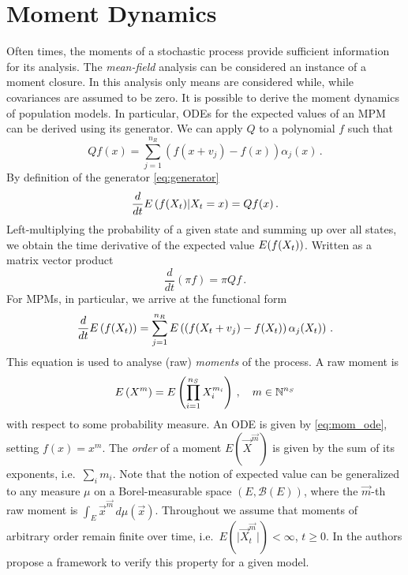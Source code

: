 \section{Moment Dynamics}\label{sec:moments_bg}
Often times, the moments of a stochastic process provide sufficient information for its analysis.
The \emph{mean-field} analysis \parencite{bortolussi2020fluid} can be considered an instance of a moment closure.
In this analysis only means are considered while, while covariances are assumed to be zero.
It is possible to derive the moment dynamics of population models.
In particular, \acp{ODE} for the expected values of an \ac{MPM} can be derived using its generator.
We can apply $Q$ to a polynomial $f$ such that
\begin{equation}\label{eq:Qf}
    Qf(x) = \sum_{j=1}^{n_R}\left(f(x+v_j) - f(x)\right)\alpha_j(x)\,.
\end{equation}
By definition of the generator \eqref{eq:generator}
\[
    \frac{d}{dt}{E}\left(f(X_t)|X_t=x\right) = Qf(x)\,.
\]
Left-multiplying the probability of a given state and summing up over all states, we
obtain the time derivative of the expected value ${E}(f(X_t))$.
Written as a matrix vector product
\[
    \frac{d}{dt}(\pi f) = \pi Qf\,.
\]
For \acp{MPM}, in particular, we arrive at the functional form
\begin{equation}\label{eq:mom_ode}
    \frac{d}{dt}{E}\left(f({X}_t)\right) = \sum_{j=1}^{n_R}{E}\left(\left(f({X_t +
    v_j}) - f(X_t)\right)\alpha_j(X_t)\right)\,.
\end{equation}
This equation is used to analyse (raw) \emph{moments} of the process.
A raw moment is
\[{E}\left(X^{m}\right)={E}\left(\prod_{i=1}^{n_S} X_i^{m_i}\right)\,,\quad m\in {\mathbb{N}}^{n_S}\]
with respect to some probability measure.
An \ac{ODE} is given by \eqref{eq:mom_ode}, setting $f(x)=x^m$.
The \emph{order} of a moment $E({\vec X}^{\vec m})$ is given by the sum of its exponents,
i.e.\ $\sum_i m_i$.
Note that the notion of  expected value can be generalized
to any measure $\mu$ on a Borel-measurable space
$(E, \mathcal{B}(E))$, where
 the $\vec{m}$-th raw moment is $\int_E {\vec x}^{\vec m}\,d\mu(\vec x)$.
Throughout we assume that moments of arbitrary order remain finite over time,
i.e.\ $E(\lvert \vec{X}^{\vec{m}}_t\rvert)<\infty$, $t\geq 0$.
In \citet{gupta2014scalable} the authors propose a framework to verify
this property for a given model.


